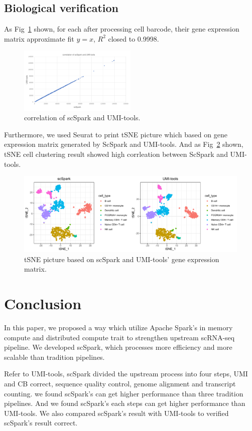 \documentclass[conference]{IEEEtran}
\begin{document}
\subsection{Biological verification} 
As Fig~\ref{fig9} shown, for each after processing cell barcode, their gene expression matrix approximate fit $y=x$, $R^{2}$ closed to 0.9998. 
\begin{figure}
  \includegraphics[width=0.5\textwidth]{fig9.pdf}
  \caption{correlation of scSpark and UMI-tools.} \label{fig9}
\end{figure}
Furthermore, we used Seurat to print tSNE picture which based on gene expression matrix generated by ScSpark and UMI-tools. 
And as Fig~\ref{fig10} shown, tSNE cell clustering result showed high corrleation between ScSpark and UMI-tools. 
\begin{figure}
  \includegraphics[width=\textwidth]{fig10.pdf}
  \caption{tSNE picture based on scSpark and UMI-tools' gene expression matrix.} \label{fig10}
\end{figure}

\section{Conclusion}
In this paper, we proposed a way which utilize Apache Spark's in memory compute and distributed compute trait to strengthen upstream scRNA-seq pipeline.
We developed scSpark, which processes more efficiency and more scalable than tradition pipelines.

Refer to UMI-tools, scSpark divided the upstream process into four steps, UMI and CB correct, sequence quality control, genome alignment and transcript counting.
we found scSpark's can get higher performance than three tradition pipelines.
And we found scSpark's each steps can get higher performance than UMI-tools.
We also compared scSpark's result with UMI-tools to verified scSpark's result correct.



\end{document}
